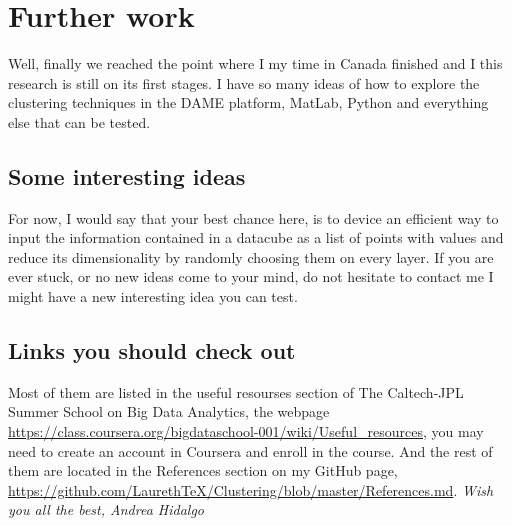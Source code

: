 \documentclass[11pt,fleqn]{book} %
\begin{document}
\section{Further work}
Well, finally we reached the point where I my time in Canada finished and I this research is still on its first stages. I have so many ideas of how to explore the clustering techniques in the DAME platform, MatLab, Python and everything else that can be tested. 

\subsection{Some interesting ideas}
For now, I would say that your best chance here, is to device an efficient way to input the information contained in a datacube as a list of points with values and reduce its dimensionality by randomly choosing them on every layer. If you are ever stuck, or no new ideas come to your mind, do not hesitate to contact me I might have a new interesting idea you can test.

\subsection{Links you should check out}
Most of them are listed in the useful resourses section of The Caltech-JPL Summer School on Big Data Analytics, the webpage \url{https://class.coursera.org/bigdataschool-001/wiki/Useful_resources}, you may need to create an account in Coursera and enroll in the course. And the rest of them are located in the References section on my GitHub page, \url{https://github.com/LaurethTeX/Clustering/blob/master/References.md}.
\vfill
\textit{Wish you all the best, Andrea Hidalgo}
\end{document}
